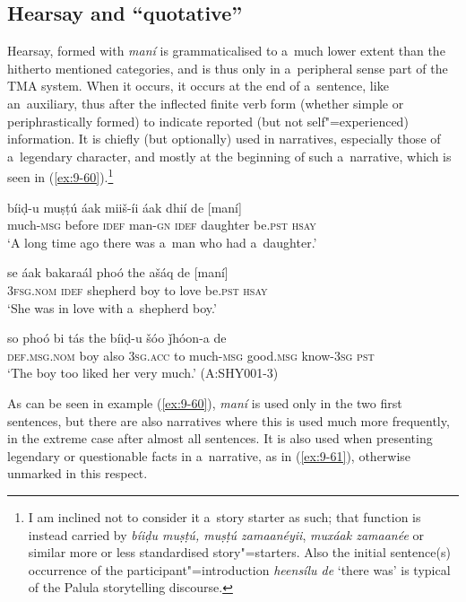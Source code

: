 \subsection{Hearsay and ``quotative''}
\label{subsec:9-2-4}

Hearsay, formed with \textit{maní} is grammaticalised to a~much lower extent than the hitherto mentioned categories, and is thus only in a~peripheral sense part of the TMA system. When it occurs, it occurs at the end of a~sentence, like an~auxiliary, thus after the inflected finite verb form (whether simple or periphrastically formed) to indicate reported (but not self"=experienced) information. It is chiefly (but optionally) used in narratives, especially those of a~legendary character, and mostly at the beginning of such a~narrative, which is seen in (\ref{ex:9-60}).\footnote{I am inclined not to consider it a~story starter as such; that function is instead carried by \textit{bíiḍu muṣṭú, muṣṭú zamaanéyii}, \textit{muxáak zamaanée} or similar more or less standardised story"=starters. Also the initial sentence(s) occurrence of the participant"=introduction \textit{heensílu de} `there was' is typical of the Palula storytelling discourse.} 

\begin{exe}
\ex
\label{ex:9-60}
\gll \label{bkm:Ref190746425}bíiḍ-u muṣṭú áak miiš-íi áak dhií de [maní] \\
much-\textsc{msg} before \textsc{idef} man-\textsc{gn} \textsc{idef} daughter be.\textsc{pst}
\textsc{hsay} \\
\glt `A long time ago there was a~man who had a~daughter.' 

\gll se áak bakaraál phoó the ašáq de [maní] \\
\textsc{3fsg.nom} \textsc{idef} shepherd boy to love be.\textsc{pst} \textsc{hsay} \\
\glt `She was in love with a~shepherd boy.'

\gll so phoó bi tás the bíiḍ-u  šóo ǰhóon-a de \\
\textsc{def.msg.nom} boy also \textsc{3sg.acc} to much-\textsc{msg}  good.\textsc{msg} know-\textsc{3sg} \textsc{pst} \\
\glt `The boy too liked her very much.' (A:SHY001-3)
\end{exe}

As can be seen in example (\ref{ex:9-60}), \textit{maní} is used only in the two first sentences, but there are also narratives where this is used much more frequently, in the extreme case after almost all sentences. It is also used when presenting legendary or questionable facts in a~narrative, as in (\ref{ex:9-61}), otherwise unmarked in this respect.

